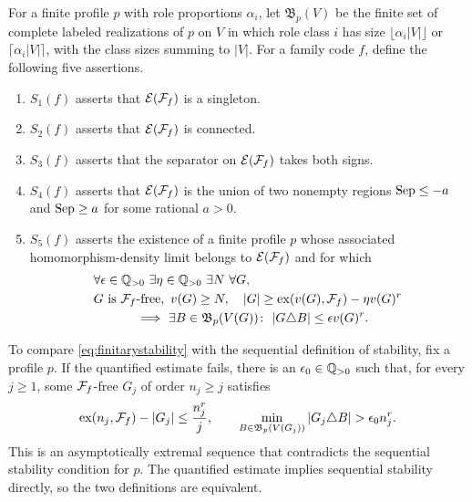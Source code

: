 \documentclass[10pt]{article}
\numberwithin{equation}{section}
\theoremstyle{definition}
\newcommand{\ex}{\operatorname{ex}}\newcommand{\supp}{\operatorname{supp}}
\begin{document}
For a finite profile $p$ with role proportions $\alpha_i$, let $\mathfrak B_p(V)$ be the finite set of complete labeled realizations of $p$ on $V$ in which role class $i$ has size $\lfloor\alpha_i|V|\rfloor$ or $\lceil\alpha_i|V|\rceil$, with the class sizes summing to $|V|$. For a family code $f$, define the following five assertions.
\begin{enumerate}
\item $S_1(f)$ asserts that $\mathcal E(\mathcal F_f)$ is a singleton.
\item $S_2(f)$ asserts that $\mathcal E(\mathcal F_f)$ is connected.
\item $S_3(f)$ asserts that the separator on $\mathcal E(\mathcal F_f)$ takes both signs.
\item $S_4(f)$ asserts that $\mathcal E(\mathcal F_f)$ is the union of two nonempty regions $\operatorname{Sep}\le-a$ and $\operatorname{Sep}\ge a$ for some rational $a>0$.
\item $S_5(f)$ asserts the existence of a finite profile $p$ whose associated homomorphism-density limit belongs to $\mathcal E(\mathcal F_f)$ and for which
\begin{equation}\label{eq:finitarystability}
\begin{aligned}
 &\forall\epsilon\in\Q_{>0}\ \exists\eta\in\Q_{>0}\ \exists N\ \forall G,\\
 &G\text{ is }\cF_f\text{-free},\ v(G)\ge N,\quad
            |G|\ge\ex(v(G),\cF_f)-\eta v(G)^r\\
 &\hspace{12mm}\Longrightarrow\
   \exists B\in\mathfrak B_p(V(G))\colon\ |G\triangle B|\le\epsilon v(G)^r.
\end{aligned}
\end{equation}
\end{enumerate}
To compare \eqref{eq:finitarystability} with the sequential definition of stability, fix a profile $p$. If the quantified estimate fails, there is an $\epsilon_0\in\mathbb Q_{>0}$ such that, for every $j\ge1$, some $\mathcal F_f$-free $G_j$ of order $n_j\ge j$ satisfies
\[
 \ex(n_j,\cF_f)-|G_j|\le \frac{n_j^r}{j},\qquad
 \min_{B\in\mathfrak B_p(V(G_j))}|G_j\triangle B|>\epsilon_0n_j^r.
\]
This is an asymptotically extremal sequence that contradicts the sequential stability condition for $p$. The quantified estimate implies sequential stability directly, so the two definitions are equivalent.
\end{document}
